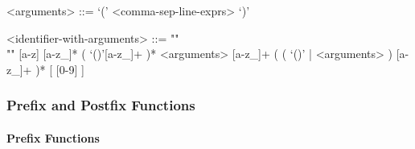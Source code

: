 \documentclass{article}
\begin{document}
\begin{itemize}
\begin{grammar}
<arguments> ::= `(' <comma-sep-line-exprs> `)'

<identifier-with-arguments> ::= ""\\""
[a-z] [a-z_]* ( `()'[a-z_]+ )* <arguments>
[a-z_]+ ( ( `()' | <arguments> ) [a-z_]+ )* 
[ [0-9] ]
\end{grammar}

\end{itemize}

\subsubsection{Prefix and Postfix Functions}
 
\paragraph{Prefix Functions}
\end{document}
